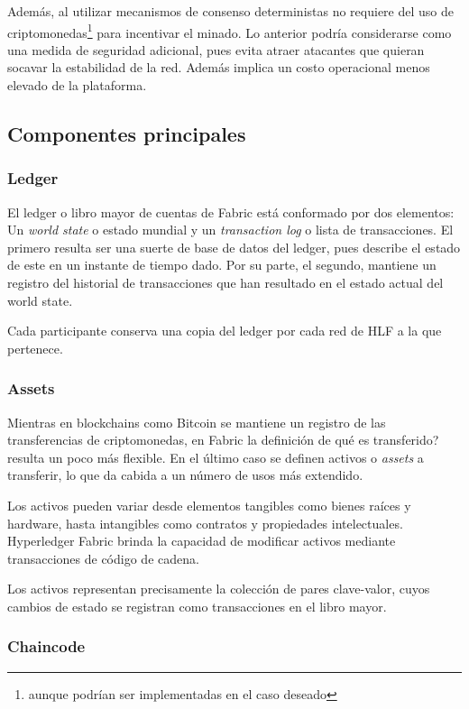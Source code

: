 Adem\'as, al utilizar mecanismos de consenso deterministas no requiere del uso de criptomonedas\footnote{aunque podr\'ian ser implementadas en el caso deseado} para incentivar el minado. Lo anterior podr\'ia considerarse como una medida de seguridad adicional, pues evita atraer atacantes que quieran socavar la estabilidad de la red. Adem\'as implica un costo operacional menos elevado de la plataforma.

\subsection{Componentes principales}

\subsubsection{Ledger}
El ledger o libro mayor de cuentas de Fabric est\'a conformado por dos elementos: Un \emph{world state} o estado mundial y un \emph{transaction log} o lista de transacciones. El primero resulta ser una suerte de base de datos del ledger, pues describe el estado de este en un instante de tiempo dado. Por su parte, el segundo, mantiene un registro del historial de transacciones que han resultado en el estado actual del world state.

Cada participante conserva una copia del ledger por cada red de HLF  a la que pertenece.

\subsubsection{Assets}
Mientras en blockchains como Bitcoin se mantiene un registro de las transferencias de criptomonedas, en Fabric la definici\'on de \textquestiondown qu\'e es transferido? resulta un poco m\'as flexible. En el \'ultimo caso se definen activos o \emph{assets} a transferir, lo que da cabida a un n\'umero de usos m\'as extendido.

Los activos pueden variar desde elementos tangibles como bienes ra\'ices y hardware, hasta intangibles como contratos y propiedades intelectuales. Hyperledger Fabric brinda la capacidad de modificar activos mediante transacciones de c\'odigo de cadena.

Los activos representan precisamente la colecci\'on de pares clave-valor, cuyos cambios de estado se registran como transacciones en el libro mayor.

\subsubsection{Chaincode}

